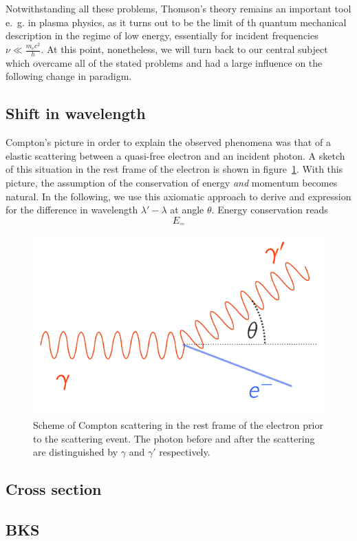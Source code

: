 Notwithstanding all these problems, Thomson's theory remains an important tool e.~g. in plasma physics, as it turns out to
be the limit of th quantum mechanical description in the regime of low energy, essentially for incident frequencies 
$\nu \ll \frac{m_ec^2}{h}$. At this point, nonetheless, we will turn back to our central subject which overcame all of the
stated problems and had a large influence on the following change in paradigm. 

\subsection{Shift in wavelength}
\label{sec:wavelength}
Compton's picture in order to explain the observed phenomena was that of a elastic scattering between a quasi-free electron
and an incident photon. A sketch of this situation in the rest frame of the electron is shown in 
figure~\ref{fig:compton_scatter}. With this picture, the assumption of the conservation of energy \textit{and} momentum 
becomes natural. In the following, we use this axiomatic approach to derive and expression for the difference in
wavelength $\lambda' - \lambda$ at angle $\theta$. Energy conservation reads 
\begin{equation}
    E_ = 	
    \label{eq:energy_conservation}
\end{equation}




\begin{figure}[htpb]
    \centering
    \includegraphics[width=0.8\linewidth]{figures/compton_scatter}
    \caption{
        Scheme of Compton scattering in the rest frame of the electron prior to the scattering event. The photon before and
        after the scattering are distinguished by $\gamma$ and $\gamma'$ respectively. 
        }
    \label{fig:compton_scatter}
\end{figure}


\subsection{Cross section}
\label{sec:cross_section}


\subsection{BKS}
\label{sec:BKS}

